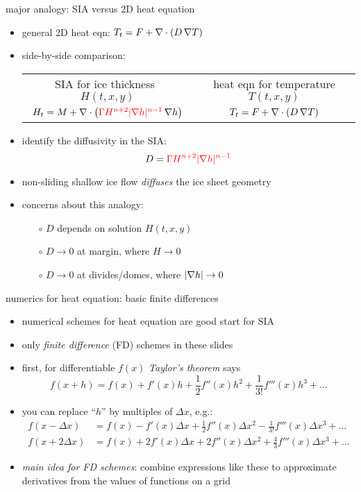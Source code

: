 \begin{frame}{major analogy: SIA versus 2D heat equation}

\begin{itemize}
\item general 2D heat eqn: \quad $T_t = F + \nabla\cdot (D\, \nabla T)$
\item side-by-side comparison:

\medskip
\begin{tabular}{cc}
\scriptsize SIA for ice thickness \, $H(t,x,y)$ & \scriptsize heat eqn for temperature $T(t,x,y)$ \normalsize \medskip \\
	\hspace{-6mm} $H_t = M + \nabla\cdot \left({\color{red}\Gamma H^{n+2} |\nabla h|^{n-1}}\, \nabla h \right)$  &  $T_t = F + \nabla\cdot (D\, \nabla T)$
\end{tabular} 

\medskip
\item identify the diffusivity in the SIA:
	$$D = {\color{red}\Gamma H^{n+2} |\nabla h|^{n-1}}$$
\item non-sliding shallow ice flow \emph{diffuses} the ice sheet geometry
\item concerns about this analogy:
  \begin{itemize}
  \item[$\circ$]  $D$ depends on solution $H(t,x,y)$
  \item[$\circ$]  $D\to 0$ at margin, where $H\to 0$
  \item[$\circ$]  $D\to 0$ at divides/domes, where $|\nabla h|\to 0$
  \end{itemize}
\end{itemize}
\end{frame}


\begin{frame}{numerics for heat equation: basic finite differences}

\begin{itemize}
\item numerical schemes for heat equation are good start for SIA
\item only \emph{finite difference} (FD) schemes in these slides

\bigskip
\item first, for differentiable $f(x)$ \emph{Taylor's theorem} says
	$$f(x+h) = f(x) + f'(x) h + \frac{1}{2} f''(x) h^2 + \frac{1}{3!} f'''(x) h^3 + \dots$$
\normalsize
\item you can replace ``$h$'' by multiples of $\Delta x$, e.g.:
\small
\begin{align*}
f(x-\Delta x) &= f(x) - f'(x) \Delta x + \frac{1}{2} f''(x) \Delta x^2 - \frac{1}{3!} f'''(x) \Delta x^3 + \dots \\
f(x+2\Delta x) &= f(x) + 2 f'(x) \Delta x + 2 f''(x) \Delta x^2 + \frac{4}{3} f'''(x) \Delta x^3 + \dots
\end{align*}
\normalsize
\item \emph{main idea for FD schemes}:  combine expressions like these to approximate derivatives from the values of functions on a grid
\end{itemize}
\end{frame}


